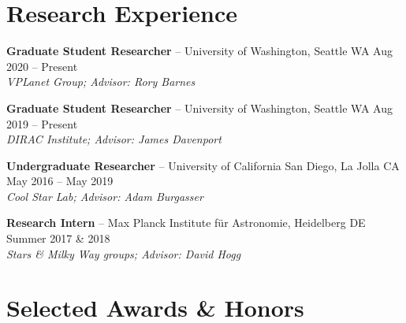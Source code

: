 \documentclass[a4,11pt]{article}
\begin{document}
\section{Research Experience} 

\textbf{Graduate Student Researcher} -- University of Washington, Seattle WA \hfill Aug 2020 -- Present \\
\textsl{VPLanet Group; Advisor: Rory Barnes} \\
\vspace{.2cm} 

\textbf{Graduate Student Researcher} -- University of Washington, Seattle WA \hfill Aug 2019 -- Present \\
\textsl{DIRAC Institute; Advisor: James Davenport} \\
\vspace{.2cm} 

\textbf{Undergraduate Researcher} -- University of California San Diego, La Jolla CA \hfill May 2016 -- May 2019  \\
\textsl{Cool Star Lab; Advisor: Adam Burgasser} \\
\vspace{.2cm} 

\textbf{Research Intern} -- Max Planck Institute f{\"u}r Astronomie, Heidelberg DE \hfill Summer 2017 \& 2018 \\
\textsl{Stars \& Milky Way groups; Advisor: David Hogg} \\


\section{Selected Awards \& Honors}
\end{document}
